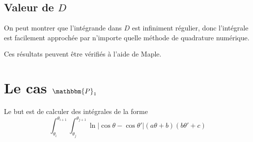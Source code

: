\documentclass[11pt,a4paper]{article}
\begin{document}
	\subsection*{Valeur de $D$}
	On peut montrer que l'intégrande dans $D$ est infiniment régulier, donc l'intégrale est facilement approchée par n'importe quelle méthode de quadrature numérique. 
	
	\begin{Rem}
		Ces résultats peuvent être vérifiés à l'aide de Maple. 	
	\end{Rem}
	
	\section{Le cas $\mathbbm{P}_1$}
	Le but est de calculer des intégrales de la forme 
	\[ \int_{\theta_i}^{\theta_{i+1}} \int_{\theta_j}^{\theta_{j+1}}\ln{|\cos\theta- \cos\theta'|}(a\theta + b)(b\theta'+c)\] 
	
		
\end{document}
